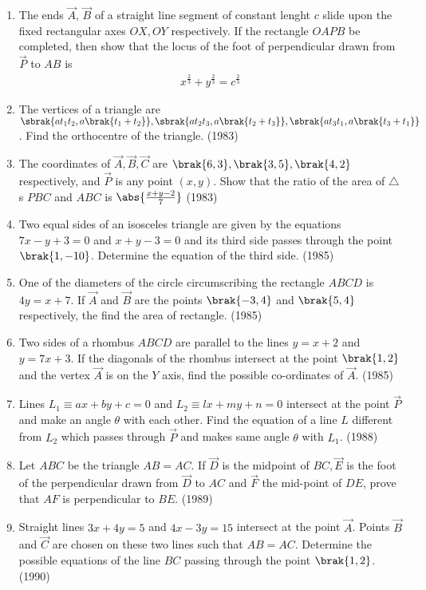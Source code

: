 \begin{enumerate}[label=\thesubsection.\arabic*.,ref=\thesubsection.\theenumi]
\item The ends $\vec{A}$, $\vec{B}$ of a straight line segment of constant lenght $c$ slide upon the fixed rectangular axes $ OX, OY$ respectively. If the rectangle $OAPB$ be completed, then show that the locus of the foot of perpendicular drawn from $\vec{P}$ to $AB$ is 
 \begin{align*}  x^\frac{2}{3} + y^\frac{2}{3} = c^\frac{2}{3} \end{align*}
  \item The vertices of a triangle are $\sbrak{ at_1t_2,a\brak{t_1+t_2}}, \sbrak{ at_2t_3,a\brak{t_2+t_3}},\sbrak{at_3t_1,a\brak{t_3+t_1}}$. Find the orthocentre of the triangle. \hfill{(1983)}
  \item The coordinates of $\vec{A},\vec{B},\vec{C}$ are $ \brak{6,3}, \brak{3,5}, \brak{4,2} $ respectively, and $\vec{P}$ is any point $(x,y)$.
Show that the ratio of the area of $\triangle$s $PBC$  and $ABC$ is $\abs{\frac{x+y-2}{7}}$ \hfill{(1983)} 
%
\item Two equal sides of an isosceles triangle are given by the equations $7x-y+3=0$ and $x+y-3=0$ and its third side passes through the point $\brak{1,-10}$. Determine the equation of the third side.  \hfill{(1985)}
%
\item One of the diameters of the circle circumscribing the rectangle $ABCD$ is $4y=x+ 7$. If $\vec{A}$ and $\vec{B}$ are the points $\brak{-3,4}$ and $\brak{5,4}$ respectively, the find the area of rectangle.  \hfill{(1985)}
%
\item Two sides of a rhombus $ABCD$ are parallel to the lines $y=x+2$ and $y=7x+3$. If the diagonals of the rhombus intersect at the point $\brak{1,2}$ and the vertex $\vec{A}$ is on the $Y$ axis, find the possible co-ordinates of $\vec{A}$.     \hfill{(1985)} 
%
\item Lines $ L_1 \equiv ax+by+c =0 $ and $ L_2 \equiv lx+my+n =0 $ intersect at the point $\vec{P}$ and make an angle $\theta$ with each other. Find the equation of a line $L$ different from $L_2$ which passes through $\vec{P}$ and makes same angle $\theta$ with $L_1$. \hfill{(1988)}
%
\item Let $ABC$ be the triangle $AB=AC$. If $\vec{D}$ is the midpoint of $ BC, \vec{E}$ is the foot of the perpendicular drawn from $\vec{D}$ to $AC$ and $\vec{F}$ the mid-point of $DE$, prove that $AF$ is perpendicular to $BE$. \hfill{(1989)}
%
\item Straight lines $3x + 4y =5$ and $ 4x-3y= 15$ intersect at the point $\vec{A}$. Points $\vec{B}$ and $\vec{C}$ are chosen on these two lines such that $AB=AC$. Determine the possible equations of the line $BC$ passing through the point $\brak{1,2}$. \hfill{(1990)}

\end{enumerate}
